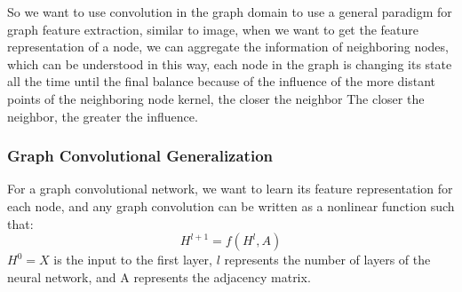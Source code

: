 \documentclass[%
reprint,
amsmath,amssymb,
aps,
]{revtex4-2}
\begin{document}
	So we want to use convolution in the graph domain to use a general paradigm for graph feature extraction, similar to image, when we want to get the feature representation of a node, we can aggregate the information of neighboring nodes, which can be understood in this way, each node in the graph is changing its state all the time until the final balance because of the influence of the more distant points of the neighboring node kernel, the closer the neighbor The closer the neighbor, the greater the influence.
	\subsubsection{Graph Convolutional Generalization}	
	For a graph convolutional network, we want to learn its feature representation for each node, and any graph convolution can be written as a nonlinear function such that:
	\begin{equation}\label{key}
		H^{l+1} = f(H^l,A)
	\end{equation}
	$H^0 = X$ is the input to the first layer, $l$ represents the number of layers of the neural network, and A represents the adjacency matrix.
\end{document}
